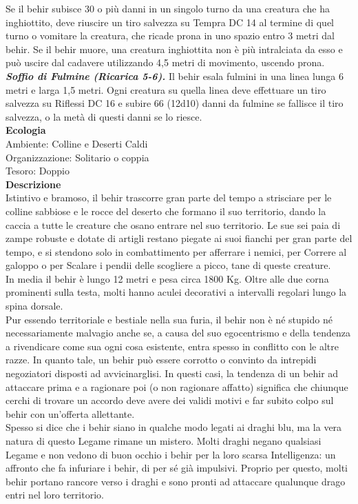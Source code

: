 \begin{multicols}{2}
Se il behir subisce 30 o più danni in un singolo turno da una creatura che ha inghiottito, deve riuscire un tiro salvezza su Tempra DC 14 al termine di quel turno o vomitare la creatura, che ricade prona in uno spazio entro 3 metri dal behir. Se il behir muore, una creatura inghiottita non è più intralciata da esso e può uscire dal cadavere utilizzando 4,5 metri di movimento, uscendo prona.\\
\emph{\textbf{Soffio di Fulmine (Ricarica 5-6).}} Il behir esala fulmini in una linea lunga 6 metri e larga 1,5 metri. Ogni creatura su quella linea deve effettuare un tiro salvezza su Riflessi DC 16 e subire 66 (12d10) danni da fulmine se fallisce il tiro salvezza, o la metà di questi danni se lo riesce.\\
\textbf{Ecologia}\\
Ambiente: Colline e Deserti Caldi\\
Organizzazione: Solitario o coppia\\
Tesoro: Doppio\\
\textbf{Descrizione}\\
Istintivo e bramoso, il behir trascorre gran parte del tempo a strisciare per le colline sabbiose e le rocce del deserto che formano il suo territorio, dando la caccia a tutte le creature che osano entrare nel suo territorio. Le sue sei paia di zampe robuste e dotate di artigli restano piegate ai suoi fianchi per gran parte del tempo, e si stendono solo in combattimento per afferrare i nemici, per Correre al galoppo o per Scalare i pendii delle scogliere a picco, tane di queste creature.\\
In media il behir è lungo 12 metri e pesa circa 1800 Kg. Oltre alle due corna prominenti sulla testa, molti hanno aculei decorativi a intervalli regolari lungo la spina dorsale.\\
Pur essendo territoriale e bestiale nella sua furia, il behir non è né stupido né necessariamente malvagio anche se, a causa del suo egocentrismo e della tendenza a rivendicare come sua ogni cosa esistente, entra spesso in conflitto con le altre razze. In quanto tale, un behir può essere corrotto o convinto da intrepidi negoziatori disposti ad avvicinarglisi. In questi casi, la tendenza di un behir ad attaccare prima e a ragionare poi (o non ragionare affatto) significa che chiunque cerchi di trovare un accordo deve avere dei validi motivi e far subito colpo sul behir con un’offerta allettante.\\
Spesso si dice che i behir siano in qualche modo legati ai draghi blu, ma la vera natura di questo Legame rimane un mistero. Molti draghi negano qualsiasi Legame e non vedono di buon occhio i behir per la loro scarsa Intelligenza: un affronto che fa infuriare i behir, di per sé già impulsivi. Proprio per questo, molti behir portano rancore verso i draghi e sono pronti ad attaccare qualunque drago entri nel loro territorio.\\


\end{multicols}

